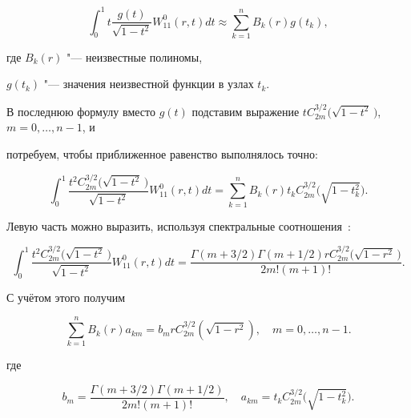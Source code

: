 \begin{equation}

\int _{0}^{1}t \frac{g(t)}{\sqrt{1-t^{2}}} W^{0}_{11}(r,t)dt\approx\sum\limits_{k=1}^{n}B_{k}(r)g(t_{k}),

\label{eq:kov:antvel18}

\end{equation}

где $B_{k}(r)$ "--- неизвестные полиномы, 

$g(t_{k})$ "--- значения неизвестной функции в узлах $t_{k}$.



В последнюю формулу вместо $g(t)$ подставим выражение $t C^{{3}/{2}}_{2m}\bigl(\sqrt{1-t^{2}}\,\bigr)$, $m=0, \ldots, n-1$, и

потребуем, чтобы приближенное равенство выполнялось точно:

\begin{equation*}

\int _{0}^{1}\frac{t^{2} C^{{3}/{2}}_{2m}\bigl(\sqrt{1-t^{2}}\,\bigr)}{\sqrt{1-t^{2}}} W^{0}_{11}(r,t)dt=\sum\limits_{k=1}^{n}B_{k}(r)t_{k}C^{{3}/{2}}_{2m} \bigl(\sqrt{1-t^{2}_{k}} \bigr).

\end{equation*}

Левую часть можно выразить, используя спектральные соотношения~\cite{antvel:bib:Popov-ru}:

\begin{equation*}

\int_{0}^{1}\frac{t^{2}

C^{{3}/{2}}_{2m}\bigl(\sqrt{1-t^{2}}\,\bigr)}{\sqrt{1-t^{2}}} W^{0}_{11}(r,t)dt=

\frac{\Gamma(m+{3}/{2})\Gamma(m+{1}/{2})rC^{{3}/{2}}_{2m}\bigl(\sqrt{1-r^{2}}\,\bigr)}{2m!(m+1)!}.

\end{equation*}

С учётом этого получим

\begin{equation*}

\sum\limits_{k=1}^{n}B_{k}(r)a_{km}=b_{m}rC^{{3}/{2}}_{2m}(\sqrt{1-r^{2}}),\quad  m=0, \ldots, n-1.

\end{equation*}

где

$$b_{m}=\frac{\Gamma(m+{3}/{2})\Gamma(m+{1}/{2})}{2m!(m+1)!}, \quad 

a_{km}=t_{k}C^{{3}/{2}}_{2m}\bigl(\sqrt{1-t^{2}_{k}}\bigr) .$$



